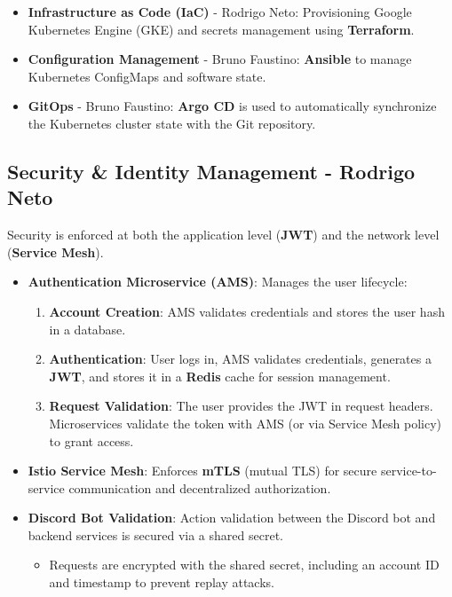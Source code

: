 \documentclass[11pt,a4paper]{article}
\newcommand{\bff}[1]{\textbf{#1}}
\begin{document}
 \begin{itemize}
  \item \bff{Infrastructure as Code (IaC)} - Rodrigo Neto: Provisioning Google Kubernetes Engine (GKE) and secrets management using \bff{Terraform}.
  \item \bff{Configuration Management} - Bruno Faustino: \bff{Ansible} to manage Kubernetes ConfigMaps and software state.
  \item \bff{GitOps} - Bruno Faustino: \bff{Argo CD} is used to automatically synchronize the Kubernetes cluster state with the Git repository.
 \end{itemize}

 \subsection{Security \& Identity Management - Rodrigo Neto}

 Security is enforced at both the application level (\bff{JWT}) and the network level (\bff{Service Mesh}).

 \begin{itemize}
  \item \bff{Authentication Microservice (AMS)}: Manages the user lifecycle:
  \begin{enumerate}
   \item \bff{Account Creation}: AMS validates credentials and stores the user hash in a database.
   \item \bff{Authentication}: User logs in, AMS validates credentials, generates a \bff{JWT}, and stores it in a \bff{Redis} cache for session management.
   \item \bff{Request Validation}: The user provides the JWT in request headers. Microservices validate the token with AMS (or via Service Mesh policy) to grant access.
  \end{enumerate}
  \item \bff{Istio Service Mesh}: Enforces \bff{mTLS} (mutual TLS) for secure service-to-service communication and decentralized authorization.
  \item \bff{Discord Bot Validation}: Action validation between the Discord bot and backend services is secured via a shared secret.
  \begin{itemize}
   \item Requests are encrypted with the shared secret, including an account ID and timestamp to prevent replay attacks.
  \end{itemize}
 \end{itemize}
\end{document}
